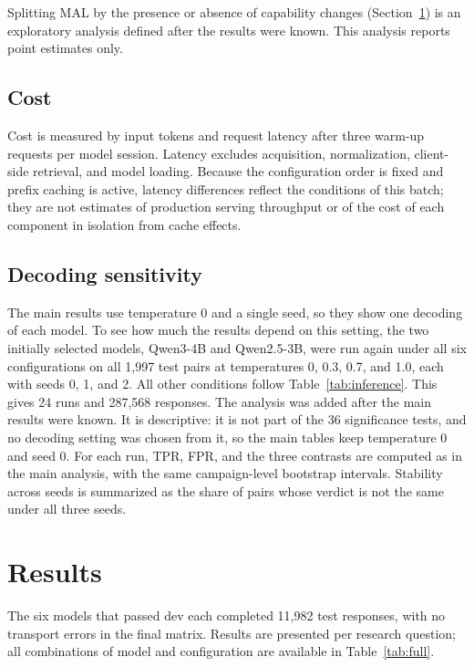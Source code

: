 \documentclass[a4paper,fleqn]{cas-dc}
\begin{document}
Splitting MAL by the presence or absence of capability changes
(Section~\ref{sec:results}) is an exploratory analysis defined after the results
were known. This analysis reports point estimates only.

\subsection{Cost}
Cost is measured by input tokens and request latency after three warm-up
requests per model session. Latency excludes acquisition, normalization,
client-side retrieval, and model loading. Because the configuration order is
fixed and prefix caching is active, latency differences reflect the conditions of
this batch; they are not estimates of production serving throughput or of the
cost of each component in isolation from cache effects.

\subsection{Decoding sensitivity}\label{sec:decoding}
The main results use temperature 0 and a single seed, so they show one decoding
of each model. To see how much the results depend on this setting, the two
initially selected models, Qwen3-4B and Qwen2.5-3B, were run again under all six
configurations on all 1,997 test pairs at temperatures 0, 0.3, 0.7, and 1.0, each
with seeds 0, 1, and 2. All other conditions follow Table~\ref{tab:inference}.
This gives 24 runs and 287,568 responses. The analysis was added after the main
results were known. It is descriptive: it is not part of the 36 significance
tests, and no decoding setting was chosen from it, so the main tables keep
temperature 0 and seed 0. For each run, TPR, FPR, and the three contrasts are
computed as in the main analysis, with the same campaign-level bootstrap
intervals. Stability across seeds is summarized as the share of pairs whose
verdict is not the same under all three seeds.

\section{Results}\label{sec:results}
The six models that passed dev each completed 11,982 test responses, with no
transport errors in the final matrix. Results are presented per research
question; all combinations of model and configuration are available in
Table~\ref{tab:full}.
\end{document}
